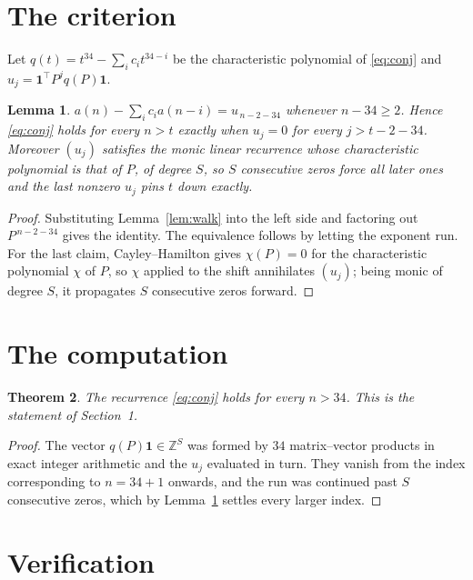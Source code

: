 \documentclass[11pt,a4paper]{article}
\theoremstyle{plain}
\newtheorem{theorem}{Theorem}
\newtheorem{lemma}[theorem]{Lemma}
\theoremstyle{definition}
\begin{document}
\section{The criterion}

Let $q(t)=t^{34}-\sum_i c_i t^{34-i}$ be the characteristic polynomial of
\eqref{eq:conj} and $u_j=\mathbf{1}^{\!\top}P^{j}q(P)\mathbf{1}$.

\begin{lemma}\label{lem:crit}
$a(n)-\sum_i c_i a(n-i)=u_{\,n-2-34}$ whenever $n-34\ge2$. Hence
\eqref{eq:conj} holds for every $n>t$ exactly when $u_j=0$ for every
$j>t-2-34$. Moreover $(u_j)$ satisfies the monic linear recurrence whose
characteristic polynomial is that of $P$, of degree $S$, so $S$ consecutive zeros force all
later ones and the last nonzero $u_j$ pins $t$ down exactly.
\end{lemma}

\begin{proof}
Substituting Lemma~\ref{lem:walk} into the left side and factoring out
$P^{\,n-2-34}$ gives the identity. The equivalence follows by letting the exponent
run. For the last claim, Cayley--Hamilton gives $\chi(P)=0$ for the characteristic
polynomial $\chi$ of $P$, so $\chi$ applied to the shift annihilates $(u_j)$; being monic of
degree $S$, it propagates $S$ consecutive zeros forward.
\end{proof}

\section{The computation}

\begin{theorem}
The recurrence \eqref{eq:conj} holds for every $n>34$. This is the statement of
Section~1.
\end{theorem}

\begin{proof}
The vector $q(P)\mathbf{1}\in\mathbb{Z}^{S}$ was formed by $34$ matrix--vector
products in exact integer arithmetic and the $u_j$ evaluated in turn. They vanish from the
index corresponding to $n=34+1$ onwards, and the run was continued past $S$ consecutive
zeros, which by Lemma~\ref{lem:crit} settles every larger index.
\end{proof}

\section{Verification}
\end{document}
